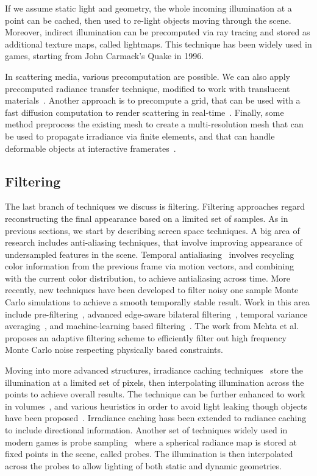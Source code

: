 If we assume static light and geometry, the whole incoming illumination at a point can be cached, then used to re-light objects moving through the scene. Moreover, indirect illumination can be precomputed via ray tracing and stored as additional texture maps, called lightmaps. This technique has been widely used in games, starting from John Carmack's Quake in 1996.    

In scattering media, various precomputation are possible. We can also apply precomputed radiance transfer technique, modified to work with translucent materials~\cite{Sloan2003}. Another approach is to precompute a grid, that can be used with a fast diffusion computation to render scattering in real-time~\cite{Wang2008a}. Finally, some method preprocess the existing mesh to create a multi-resolution mesh that can be used to propagate irradiance via finite elements, and that can handle deformable objects at interactive framerates~\cite{Mertens2003, Li2013}. 

\subsection{Filtering}

The last branch of techniques we discuss is filtering. Filtering approaches regard reconstructing the final appearance based on a limited set of samples. As in previous sections, we start by describing screen space techniques. A big area of research includes anti-aliasing techniques, that involve improving appearance of undersampled features in the scene. Temporal antialiasing~\cite{Karis2014,Patney2016} involves recycling color information from the previous frame via motion vectors, and combining with the current color distribution, to achieve antialiasing across time. More recently, new techniques have been developed to filter noisy one sample Monte Carlo simulations to achieve a smooth temporally stable result. Work in this area include pre-filtering~\cite{Crassin2015}, advanced edge-aware bilateral filtering~\cite{Mara2017}, temporal variance averaging~\cite{Schied17}, and machine-learning based filtering~\cite{Chaitanya2017}. The work from Mehta et al.~\cite{Mehta2013} proposes an adaptive filtering scheme to efficiently filter out high frequency Monte Carlo noise respecting physically based constraints.

Moving into more advanced structures, irradiance caching techniques~\cite{Ward1988, Tole2002} store the illumination at a limited set of pixels, then interpolating illumination across the points to achieve overall results. The technique can be further enhanced to work in volumes~\cite{Greger1998}, and various heuristics in order to avoid light leaking though objects have been proposed~\cite{Gautron2009}. Irradiance caching hass been extended to radiance caching to include directional information. Another set of techniques widely used in modern games is probe sampling~\cite{Levoy1996,Hooker2016, McGuire2017,Silvennoinen2017} where a spherical radiance map is stored at fixed points in the scene, called probes. The illumination is then interpolated across the probes to allow lighting of both static and dynamic geometries. 

